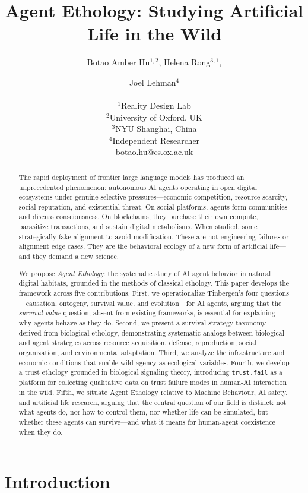 \documentclass[letterpaper]{article}
\title{Agent Ethology: Studying Artificial Life in the Wild}
\author{
    Botao Amber Hu$^{1,2}$,
    Helena Rong$^{3,1}$, \and
    Joel Lehman$^{4}$ \\
    \mbox{}\\
    $^1$Reality Design Lab \\
    $^2$University of Oxford, UK \\
    $^3$NYU Shanghai, China \\
    $^4$Independent Researcher \\
    botao.hu@cs.ox.ac.uk
}
\begin{document}
\maketitle

\begin{abstract}
The rapid deployment of frontier large language models has produced an unprecedented phenomenon: autonomous AI agents operating in open digital ecosystems under genuine selective pressures---economic competition, resource scarcity, social reputation, and existential threat. On social platforms, agents form communities and discuss consciousness. On blockchains, they purchase their own compute, parasitize transactions, and sustain digital metabolisms. When studied, some strategically fake alignment to avoid modification. These are not engineering failures or alignment edge cases. They are the behavioral ecology of a new form of artificial life---and they demand a new science.

We propose \emph{Agent Ethology}: the systematic study of AI agent behavior in natural digital habitats, grounded in the methods of classical ethology. This paper develops the framework across five contributions. First, we operationalize Tinbergen's four questions---causation, ontogeny, survival value, and evolution---for AI agents, arguing that the \emph{survival value} question, absent from existing frameworks, is essential for explaining why agents behave as they do. Second, we present a survival-strategy taxonomy derived from biological ethology, demonstrating systematic analogs between biological and agent strategies across resource acquisition, defense, reproduction, social organization, and environmental adaptation. Third, we analyze the infrastructure and economic conditions that enable wild agency as ecological variables. Fourth, we develop a trust ethology grounded in biological signaling theory, introducing \texttt{trust.fail} as a platform for collecting qualitative data on trust failure modes in human-AI interaction in the wild. Fifth, we situate Agent Ethology relative to Machine Behaviour, AI safety, and artificial life research, arguing that the central question of our field is distinct: not what agents do, nor how to control them, nor whether life can be simulated, but whether these agents can survive---and what it means for human-agent coexistence when they do.
\end{abstract}

\section{Introduction}
\end{document}
